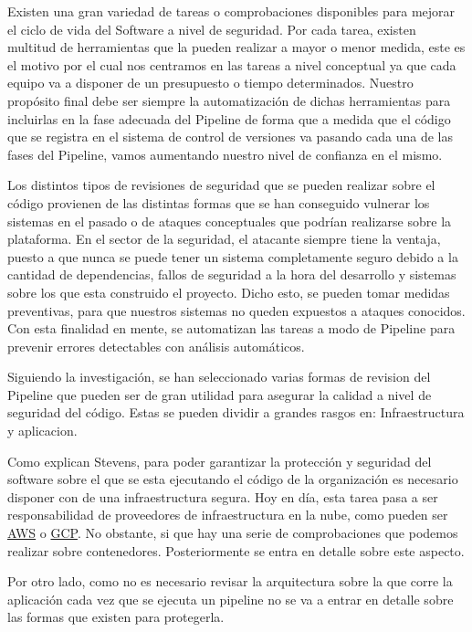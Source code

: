 \documentclass[12pt]{report} %
\begin{document}
Existen una gran variedad de tareas o comprobaciones disponibles para mejorar el
ciclo de vida del Software a nivel de seguridad.  Por cada tarea, existen
multitud de herramientas que la pueden realizar a mayor o menor medida, este es
el motivo por el cual nos centramos en las tareas a nivel conceptual ya que cada
equipo va a disponer de un presupuesto o tiempo determinados.  Nuestro propósito
final debe ser siempre la automatización de dichas herramientas para incluirlas
en la fase adecuada del Pipeline de forma que a medida que el código que se
registra en el sistema de control de versiones va pasando cada una de las fases
del Pipeline, vamos aumentando nuestro nivel de confianza en el mismo.

Los distintos tipos de revisiones de seguridad que se pueden realizar sobre el
código provienen de las distintas formas que se han conseguido vulnerar los
sistemas en el pasado o de ataques conceptuales que podrían realizarse sobre la
plataforma.  En el sector de la seguridad, el atacante siempre tiene la ventaja,
puesto a que nunca se puede tener un sistema completamente seguro debido a la
cantidad de dependencias, fallos de seguridad a la hora del desarrollo y
sistemas sobre los que esta construido el proyecto.  Dicho esto, se pueden tomar
medidas preventivas, para que nuestros sistemas no queden expuestos a ataques
conocidos.  Con esta finalidad en mente, se automatizan las tareas a modo de
Pipeline para prevenir errores detectables con análisis automáticos.

Siguiendo la investigación, se han seleccionado varias formas de revision del
Pipeline que pueden ser de gran utilidad para asegurar la calidad a nivel de
seguridad del código.  Estas se pueden dividir a grandes rasgos en:
Infraestructura y aplicacion.

Como explican \cite{Ensor2021} Stevens, para poder garantizar la protección y
seguridad del software sobre el que se esta ejecutando el código de la
organización es necesario disponer con de una infraestructura segura.  Hoy en
día, esta tarea pasa a ser responsabilidad de proveedores de infraestructura en
la nube, como pueden ser \href{https://aws.amazon.com/}{AWS} o
\href{https://console.cloud.google.com/}{GCP}.  No obstante, si que hay una
serie de comprobaciones que podemos realizar sobre contenedores.  Posteriormente
se entra en detalle sobre este aspecto.

Por otro lado, como no es necesario revisar la arquitectura sobre la que corre
la aplicación cada vez que se ejecuta un \Gls{pipeline} no se va a entrar en
detalle sobre las formas que existen para protegerla.
\end{document}
